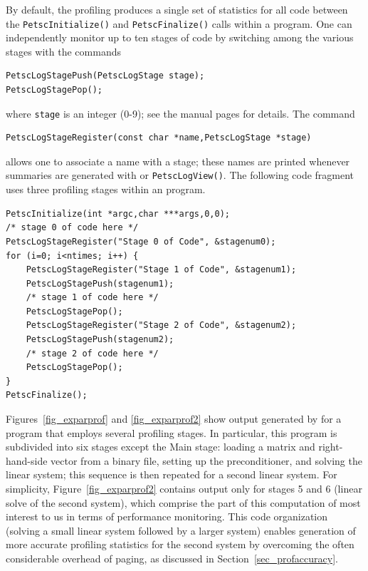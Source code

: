 {{By default, the profiling produces a single set of statistics for all
code between the \lstinline{PetscInitialize()} and \lstinline{PetscFinalize()}
calls within a program.  One can independently monitor up to ten
stages of code by switching among the various stages with the commands
\begin{lstlisting}
PetscLogStagePush(PetscLogStage stage);
PetscLogStagePop();
\end{lstlisting}
where \lstinline{stage} is an integer (0-9); see the manual pages for details.
The command
\begin{lstlisting}
PetscLogStageRegister(const char *name,PetscLogStage *stage)
\end{lstlisting}
allows one to associate a name with a stage; these names are printed whenever
summaries are generated with  or \lstinline{PetscLogView()}.
The following code fragment uses three profiling stages within an program.

\begin{lstlisting}
PetscInitialize(int *argc,char ***args,0,0);
/* stage 0 of code here */
PetscLogStageRegister("Stage 0 of Code", &stagenum0);
for (i=0; i<ntimes; i++) {
    PetscLogStageRegister("Stage 1 of Code", &stagenum1);
    PetscLogStagePush(stagenum1);
    /* stage 1 of code here */
    PetscLogStagePop();
    PetscLogStageRegister("Stage 2 of Code", &stagenum2);
    PetscLogStagePush(stagenum2);
    /* stage 2 of code here */
    PetscLogStagePop();
}
PetscFinalize();
\end{lstlisting}

Figures~\ref{fig_exparprof} and \ref{fig_exparprof2} show output
generated by  for a program that employs
several profiling stages.  In particular, this program is
subdivided into six stages except the Main stage: loading a matrix and right-hand-side
vector from a binary file, setting up the preconditioner, and solving
the linear system; this sequence is then repeated for a second linear
system.  For simplicity, Figure~\ref{fig_exparprof2} contains output
only for stages 5 and 6 (linear solve of the second system), which comprise
the part of this computation of most interest to us in terms of
performance monitoring.  This code organization (solving a small
linear system followed by a larger system) enables generation of more
accurate profiling statistics for the second system by overcoming the
often considerable overhead of paging, as discussed in
Section~\ref{sec_profaccuracy}.

}}
